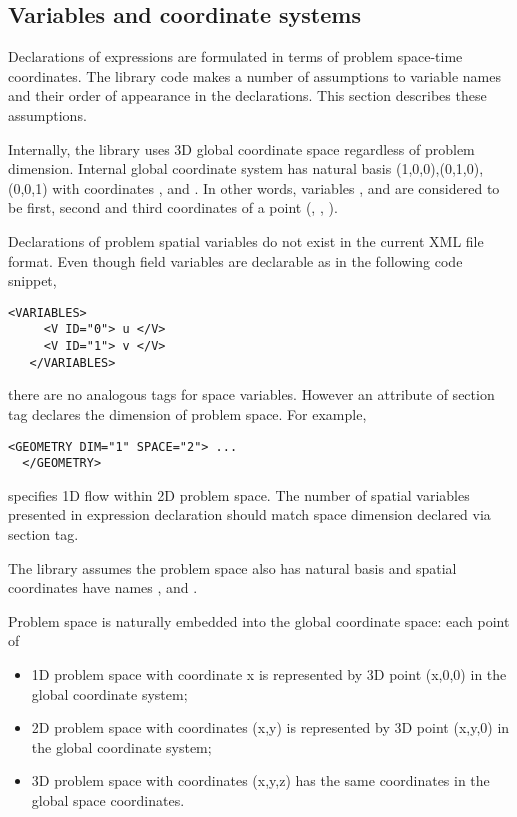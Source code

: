 \subsection{Variables and coordinate systems}
Declarations of expressions are formulated in terms of problem
space-time coordinates. The library code makes a number of assumptions to
variable names and their order of appearance in the declarations. This section
describes these assumptions.

Internally, the library uses 3D global coordinate space regardless of problem
dimension. Internal global coordinate system has natural basis
{{{(1,0,0),(0,1,0),(0,0,1)}}} with coordinates ,  and . In
other words, variables ,  and  are considered to be first,
second and third coordinates of a point (, , ).

Declarations of problem spatial variables do not exist in the current XML file
format. Even though field variables are declarable as in the following code
snippet, 
\begin{lstlisting}[style=XMLStyle]
   <VARIABLES>
     <V ID="0"> u </V>
     <V ID="1"> v </V>
   </VARIABLES>
\end{lstlisting} 
there are no analogous tags for space variables. However an attribute
 of  section tag declares the dimension of
problem space. For example, \begin{lstlisting}[style=XMLStyle]
  <GEOMETRY DIM="1" SPACE="2"> ...
  </GEOMETRY>
\end{lstlisting}
specifies 1D flow within 2D problem space. The number of spatial variables
presented in expression declaration should match space dimension declared via
 section tag.

The library assumes the problem space also has natural basis and spatial
coordinates have names ,  and .

Problem space is naturally embedded into the global coordinate space: each point
of
\begin{itemize}
\item 1D problem space with coordinate {{{x}}} is represented by 3D point
 {{{(x,0,0)}}} in the global coordinate system;
\item 2D problem space with coordinates {{{(x,y)}}} is represented by 3D point 
 {{{(x,y,0)}}} in the global coordinate system;
\item 3D problem space with coordinates {{{(x,y,z)}}} has the
 same coordinates in the global space coordinates.
\end{itemize}

